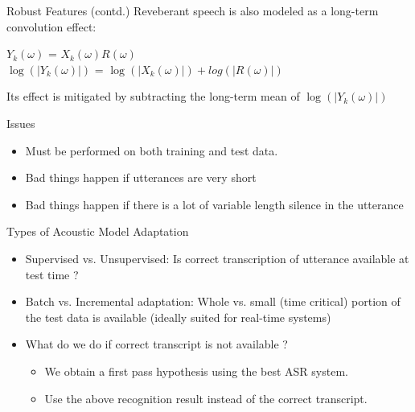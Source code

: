 \begin{frame}{Robust Features (contd.)}
Reveberant speech is also modeled as a long-term convolution effect:
        \begin{center}
                $Y_k(\omega)$ = $X_k(\omega)R(\omega)$\\
                $\log(|Y_k(\omega)|)$ = $\log(|X_k(\omega)|)+log(|R(\omega)|)$
        \end{center}
        
Its effect is mitigated by subtracting the \alert{long-term} mean of $\log(|Y_k(\omega)|)$ 
\end{frame}
        
\begin{frame}{Issues}
\begin{itemize}
\item  Must be performed on both training and test data.
\item  Bad things happen if utterances are very short
\item  Bad things happen if there is a lot of variable length silence in the utterance
\end{itemize}

\end{frame}


\begin{frame} {Types of Acoustic Model Adaptation}
\begin{itemize}
\item {\color{blue} Supervised } vs. {\color{blue} Unsupervised:} Is correct transcription of utterance available at test time ?
\item {\color{blue} Batch} vs.{\color{blue}  Incremental adaptation:} Whole vs. small (time critical) portion of the test data is available (ideally suited for real-time systems)
\item What do we do if correct transcript is not available ?
\begin{itemize}
\item We obtain a first pass hypothesis using the best ASR system.
\item Use the above recognition result instead of the correct transcript.
\end{itemize}
\end{itemize}

\end{frame}

